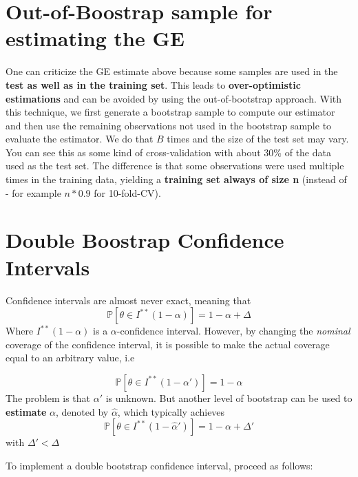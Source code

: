 \documentclass[]{book}
\begin{document}
\section{Out-of-Boostrap sample for estimating the
GE}\label{out-of-boostrap-sample-for-estimating-the-ge}

One can criticize the GE estimate above because some samples are used in
the \textbf{test as well as in the training set}. This leads to
\textbf{over-optimistic estimations} and can be avoided by using the
out-of-bootstrap approach. With this technique, we first generate a
bootstrap sample to compute our estimator and then use the remaining
observations not used in the bootstrap sample to evaluate the estimator.
We do that \(B\) times and the size of the test set may vary. You can
see this as some kind of cross-validation with about 30\% of the data
used as the test set. The difference is that some observations were used
multiple times in the training data, yielding a \textbf{training set
always of size n} (instead of - for example \(n*0.9\) for 10-fold-CV).

\section{Double Boostrap Confidence
Intervals}\label{double-boostrap-confidence-intervals}

Confidence intervals are almost never exact, meaning that
\[\mathbb{P}[\theta \in I^{**}(1-\alpha)] = 1-\alpha + \Delta\] Where
\(I^{**}(1-\alpha)\) is a \(\alpha\)-confidence interval. However, by
changing the \emph{nominal} coverage of the confidence interval, it is
possible to make the actual coverage equal to an arbitrary value, i.e

\[ \mathbb{P}[\theta \in I^{**}(1-\alpha')] = 1-\alpha\] The problem is
that \(\alpha'\) is unknown. But another level of bootstrap can be used
to \textbf{estimate} \(\alpha\), denoted by \(\hat{\alpha}\), which
typically achieves
\[\mathbb{P}[\theta \in I^{**}(1-\hat{\alpha}')] = 1- \alpha + \Delta'\]
with \(\Delta' < \Delta\)

To implement a double bootstrap confidence interval, proceed as follows:
\end{document}
